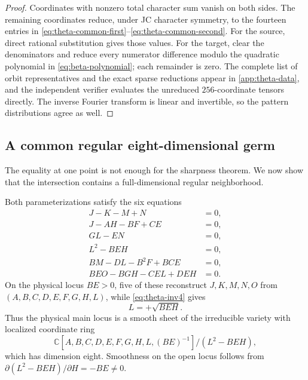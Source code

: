\begin{proof}
Coordinates with nonzero total character sum vanish on both sides.  The remaining coordinates reduce, under JC character symmetry, to the fourteen entries in \eqref{eq:theta-common-first}--\eqref{eq:theta-common-second}.  For the source, direct rational substitution gives those values.  For the target, clear the denominators and reduce every numerator difference modulo the quadratic polynomial in \eqref{eq:beta-polynomial}; each remainder is zero.  The complete list of orbit representatives and the exact sparse reductions appear in \cref{app:theta-data}, and the independent verifier evaluates the unreduced $256$-coordinate tensors directly.  The inverse Fourier transform is linear and invertible, so the pattern distributions agree as well.
\end{proof}

\subsection{A common regular eight-dimensional germ}

The equality at one point is not enough for the sharpness theorem.  We now show that the intersection contains a full-dimensional regular neighborhood.

Both parameterizations satisfy the six equations
\begin{align}
J-K-M+N&=0,\label{eq:theta-inv1}\\
J-AH-BF+CE&=0,\label{eq:theta-inv2}\\
GL-EN&=0,\label{eq:theta-inv3}\\
L^2-BEH&=0,\label{eq:theta-inv4}\\
BM-DL-B^2F+BCE&=0,\label{eq:theta-inv5}\\
BEO-BGH-CEL+DEH&=0.\label{eq:theta-inv6}
\end{align}
On the physical locus $BE>0$, five of these reconstruct $J,K,M,N,O$ from
$(A,B,C,D,E,F,G,H,L)$, while \eqref{eq:theta-inv4} gives
\[
L=+\sqrt{BEH}.
\]
Thus the physical main locus is a smooth sheet of the irreducible variety with localized coordinate ring
\begin{equation}\label{eq:theta-coordinate-ring}
\mathbb C[A,B,C,D,E,F,G,H,L,(BE)^{-1}]/(L^2-BEH),
\end{equation}
which has dimension eight.  Smoothness on the open locus follows from
$\partial(L^2-BEH)/\partial H=-BE\ne0$.

